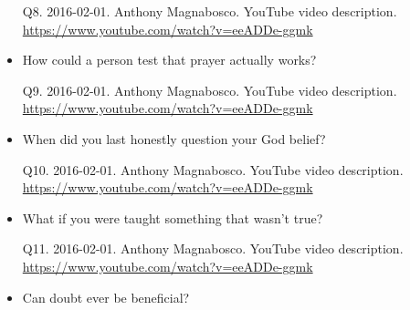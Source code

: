 \documentclass[a4paper]{scrartcl}
\begin{document}
\begin{itemize}
                \begin{tiny}
                    Q8.
                    2016-02-01.
                    Anthony Magnabosco.
                        YouTube video description.
                        \\
                        \url{ https://www.youtube.com/watch?v=eeADDe-ggmk }
                    \par
                \end{tiny}
                    \item How could a person test that prayer actually works?
                    
                \begin{tiny}
                    Q9.
                    2016-02-01.
                    Anthony Magnabosco.
                        YouTube video description.
                        \\
                        \url{ https://www.youtube.com/watch?v=eeADDe-ggmk }
                    \par
                \end{tiny}
                    \item When did you last honestly question your God belief?
                    
                \begin{tiny}
                    Q10.
                    2016-02-01.
                    Anthony Magnabosco.
                        YouTube video description.
                        \\
                        \url{ https://www.youtube.com/watch?v=eeADDe-ggmk }
                    \par
                \end{tiny}
                    \item What if you were taught something that wasn't true?
                    
                \begin{tiny}
                    Q11.
                    2016-02-01.
                    Anthony Magnabosco.
                        YouTube video description.
                        \\
                        \url{ https://www.youtube.com/watch?v=eeADDe-ggmk }
                    \par
                \end{tiny}
                    \item Can doubt ever be beneficial?
                    

\end{itemize}
\end{document}
